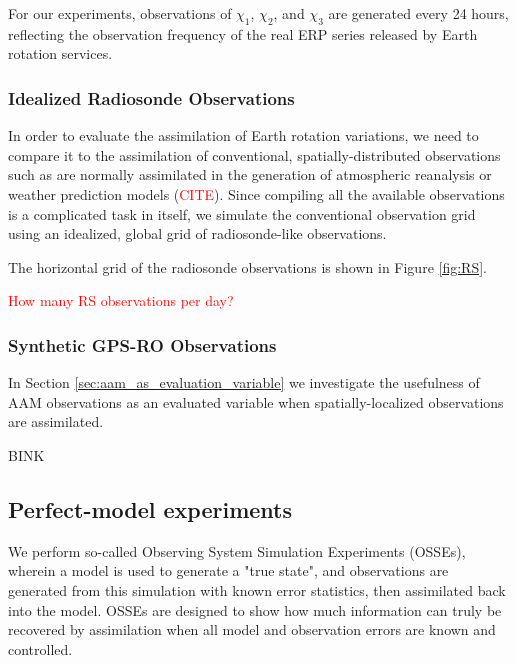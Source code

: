 For our experiments, observations of $\chi_1$, $\chi_2$, and $\chi_3$ are generated every 24 hours, reflecting the observation frequency of the real ERP series released by Earth rotation services.  


\subsubsection{Idealized Radiosonde Observations}
\label{sec:radiosondes}

In order to evaluate  the assimilation of Earth rotation variations, we need to compare it to the assimilation of conventional, spatially-distributed observations such as are normally assimilated in the generation of atmospheric reanalysis \citep{Dee2005} or weather prediction models (\textcolor{red}{CITE}).
Since compiling all the available observations is a complicated task in itself, we simulate the conventional observation grid using an idealized, global grid of radiosonde-like observations.  

The horizontal grid of the radiosonde observations is shown in Figure \ref{fig:RS}.

\textcolor{red}{How many RS observations per day?}


\subsubsection{Synthetic GPS-RO Observations}
\label{sec:gpsro}

In Section \ref{sec:aam_as_evaluation_variable} we investigate the usefulness of AAM observations as an evaluated variable when spatially-localized observations are assimilated.  

BINK



\subsection{Perfect-model experiments}
\label{sec:experiments}

We perform so-called Observing System Simulation Experiments (OSSEs), wherein a model is used to generate a "true state", and observations are generated from this simulation with known error statistics, then assimilated back into the model.
OSSEs are designed to show how much information can truly be recovered by assimilation when all model and observation errors are known and controlled. 

